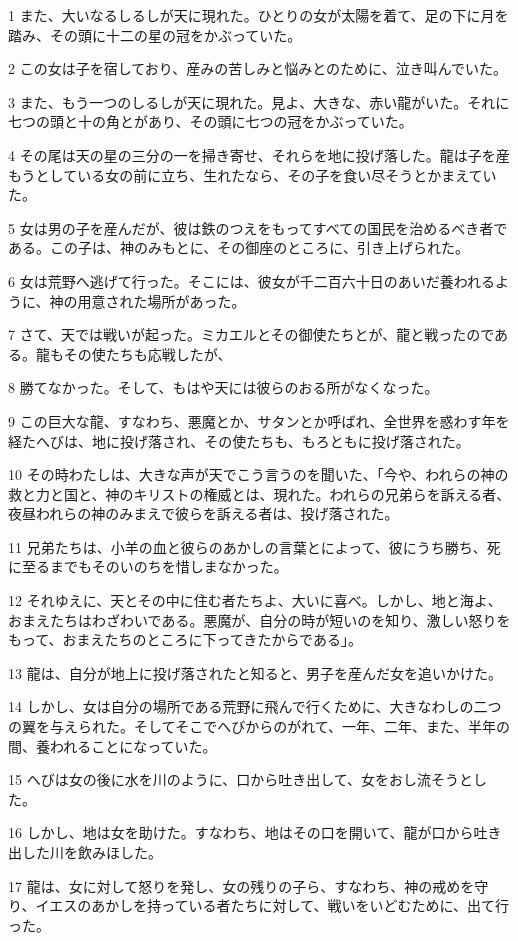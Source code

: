 \par 1 また、大いなるしるしが天に現れた。ひとりの女が太陽を着て、足の下に月を踏み、その頭に十二の星の冠をかぶっていた。
\par 2 この女は子を宿しており、産みの苦しみと悩みとのために、泣き叫んでいた。
\par 3 また、もう一つのしるしが天に現れた。見よ、大きな、赤い龍がいた。それに七つの頭と十の角とがあり、その頭に七つの冠をかぶっていた。
\par 4 その尾は天の星の三分の一を掃き寄せ、それらを地に投げ落した。龍は子を産もうとしている女の前に立ち、生れたなら、その子を食い尽そうとかまえていた。
\par 5 女は男の子を産んだが、彼は鉄のつえをもってすべての国民を治めるべき者である。この子は、神のみもとに、その御座のところに、引き上げられた。
\par 6 女は荒野へ逃げて行った。そこには、彼女が千二百六十日のあいだ養われるように、神の用意された場所があった。
\par 7 さて、天では戦いが起った。ミカエルとその御使たちとが、龍と戦ったのである。龍もその使たちも応戦したが、
\par 8 勝てなかった。そして、もはや天には彼らのおる所がなくなった。
\par 9 この巨大な龍、すなわち、悪魔とか、サタンとか呼ばれ、全世界を惑わす年を経たへびは、地に投げ落され、その使たちも、もろともに投げ落された。
\par 10 その時わたしは、大きな声が天でこう言うのを聞いた、「今や、われらの神の救と力と国と、神のキリストの権威とは、現れた。われらの兄弟らを訴える者、夜昼われらの神のみまえで彼らを訴える者は、投げ落された。
\par 11 兄弟たちは、小羊の血と彼らのあかしの言葉とによって、彼にうち勝ち、死に至るまでもそのいのちを惜しまなかった。
\par 12 それゆえに、天とその中に住む者たちよ、大いに喜べ。しかし、地と海よ、おまえたちはわざわいである。悪魔が、自分の時が短いのを知り、激しい怒りをもって、おまえたちのところに下ってきたからである」。
\par 13 龍は、自分が地上に投げ落されたと知ると、男子を産んだ女を追いかけた。
\par 14 しかし、女は自分の場所である荒野に飛んで行くために、大きなわしの二つの翼を与えられた。そしてそこでへびからのがれて、一年、二年、また、半年の間、養われることになっていた。
\par 15 へびは女の後に水を川のように、口から吐き出して、女をおし流そうとした。
\par 16 しかし、地は女を助けた。すなわち、地はその口を開いて、龍が口から吐き出した川を飲みほした。
\par 17 龍は、女に対して怒りを発し、女の残りの子ら、すなわち、神の戒めを守り、イエスのあかしを持っている者たちに対して、戦いをいどむために、出て行った。

